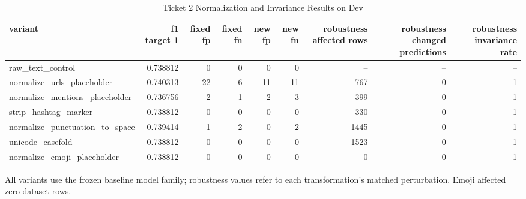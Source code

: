 \begin{table}[t]
\centering
\caption{Ticket 2 Normalization and Invariance Results on Dev}
\label{tab:normalization}
\begin{adjustbox}{max width=\textwidth}
\scriptsize
\begin{tabular}{lrrrrrrrr}
\hline
variant & f1 target 1 & fixed fp & fixed fn & new fp & new fn & robustness affected rows & robustness changed predictions & robustness invariance rate \\
\hline
raw\_text\_control & 0.738812 & 0 & 0 & 0 & 0 & -- & -- & -- \\
normalize\_urls\_placeholder & 0.740313 & 22 & 6 & 11 & 11 & 767 & 0 & 1 \\
normalize\_mentions\_placeholder & 0.736756 & 2 & 1 & 2 & 3 & 399 & 0 & 1 \\
strip\_hashtag\_marker & 0.738812 & 0 & 0 & 0 & 0 & 330 & 0 & 1 \\
normalize\_punctuation\_to\_space & 0.739414 & 1 & 2 & 0 & 2 & 1445 & 0 & 1 \\
unicode\_casefold & 0.738812 & 0 & 0 & 0 & 0 & 1523 & 0 & 1 \\
normalize\_emoji\_placeholder & 0.738812 & 0 & 0 & 0 & 0 & 0 & 0 & 1 \\
\hline
\end{tabular}
\end{adjustbox}
\par\footnotesize{All variants use the frozen baseline model family; robustness values refer to each transformation's matched perturbation. Emoji affected zero dataset rows.}
\end{table}
